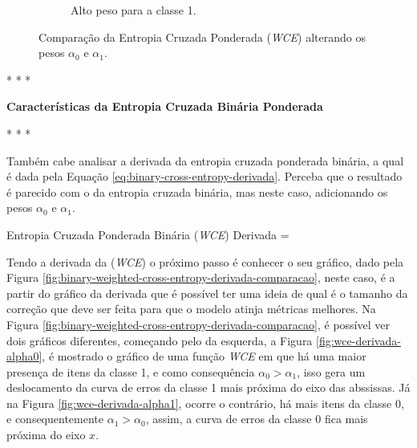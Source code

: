 \begin{figure}[h!]
\begin{subfigure}[b]{0.48\textwidth}
        \caption{Alto peso para a classe 1.}
        \label{fig:comparativo-entropia-cruzada-ponderada-binaria-com-alto-peso-para-classe-1}
    \end{subfigure}
    
    \caption{Comparação da Entropia Cruzada Ponderada (\textit{WCE}) alterando os pesos $\alpha_0$ e $\alpha_1$.}
    \label{fig:comparativo-entropia-cruzada-ponderada-binaria}
\end{figure}

\medskip
\begin{center}
 * * *
\end{center}
\medskip

\textbf{Características da Entropia Cruzada Binária Ponderada}
\vspace{1em}

\medskip
\begin{center}
 * * *
\end{center}
\medskip

Também cabe analisar a derivada da entropia cruzada ponderada binária, a qual é dada pela Equação \ref{eq:binary-cross-entropy-derivada}. Perceba que o resultado é parecido com o da entropia cruzada binária, mas neste caso, adicionando os pesos $\alpha_0$ e $\alpha_1$.

\begin{equacaodestaque}{Entropia Cruzada Ponderada Binária (\textit{WCE}) Derivada}
     = 
    \label{eq:binary-weighted-cross-entropy-derivada}
\end{equacaodestaque}

Tendo a derivada da (\textit{WCE}) o próximo passo é conhecer o seu gráfico, dado pela Figura \ref{fig:binary-weighted-cross-entropy-derivada-comparacao}, neste caso, é a partir do gráfico da derivada que é possível ter uma ideia de qual é o tamanho da correção que deve ser feita para que o modelo atinja métricas melhores. Na Figura \ref{fig:binary-weighted-cross-entropy-derivada-comparacao}, é possível ver dois gráficos diferentes, começando pelo da esquerda, a Figura \ref{fig:wce-derivada-alpha0}, é mostrado o gráfico de uma função \textit{WCE} em que há uma maior presença de itens da classe 1, e como consequência $\alpha_0 > \alpha_1$, isso gera um deslocamento da curva de erros da classe 1 mais próxima do eixo das abssissas. Já na Figura \ref{fig:wce-derivada-alpha1}, ocorre o contrário, há mais itens da classe 0, e consequentemente $\alpha_1 > \alpha_0$, assim, a curva de erros da classe 0 fica mais próxima do eixo $x$.

